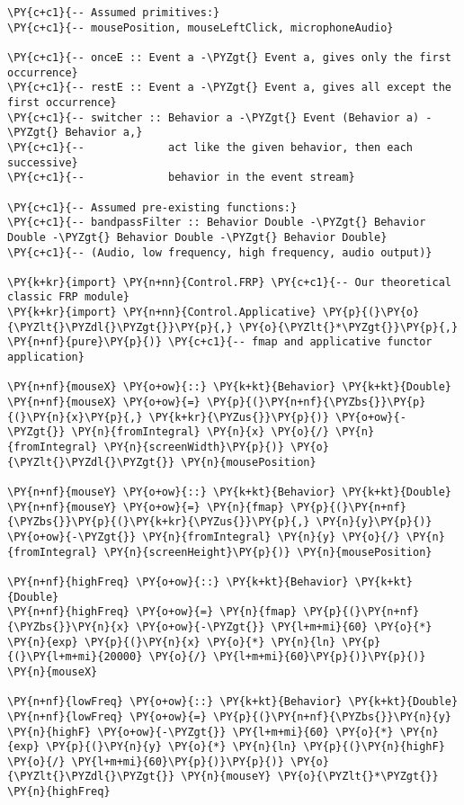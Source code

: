 \begin{Verbatim}[commandchars=\\\{\}]
\PY{c+c1}{-- Assumed primitives:}
\PY{c+c1}{-- mousePosition, mouseLeftClick, microphoneAudio}

\PY{c+c1}{-- onceE :: Event a -\PYZgt{} Event a, gives only the first occurrence}
\PY{c+c1}{-- restE :: Event a -\PYZgt{} Event a, gives all except the first occurrence}
\PY{c+c1}{-- switcher :: Behavior a -\PYZgt{} Event (Behavior a) -\PYZgt{} Behavior a,}
\PY{c+c1}{--             act like the given behavior, then each successive}
\PY{c+c1}{--             behavior in the event stream}

\PY{c+c1}{-- Assumed pre-existing functions:}
\PY{c+c1}{-- bandpassFilter :: Behavior Double -\PYZgt{} Behavior Double -\PYZgt{} Behavior Double -\PYZgt{} Behavior Double}
\PY{c+c1}{-- (Audio, low frequency, high frequency, audio output)}

\PY{k+kr}{import} \PY{n+nn}{Control.FRP} \PY{c+c1}{-- Our theoretical classic FRP module}
\PY{k+kr}{import} \PY{n+nn}{Control.Applicative} \PY{p}{(}\PY{o}{\PYZlt{}\PYZdl{}\PYZgt{}}\PY{p}{,} \PY{o}{\PYZlt{}*\PYZgt{}}\PY{p}{,} \PY{n+nf}{pure}\PY{p}{)} \PY{c+c1}{-- fmap and applicative functor application}

\PY{n+nf}{mouseX} \PY{o+ow}{::} \PY{k+kt}{Behavior} \PY{k+kt}{Double}
\PY{n+nf}{mouseX} \PY{o+ow}{=} \PY{p}{(}\PY{n+nf}{\PYZbs{}}\PY{p}{(}\PY{n}{x}\PY{p}{,} \PY{k+kr}{\PYZus{}}\PY{p}{)} \PY{o+ow}{-\PYZgt{}} \PY{n}{fromIntegral} \PY{n}{x} \PY{o}{/} \PY{n}{fromIntegral} \PY{n}{screenWidth}\PY{p}{)} \PY{o}{\PYZlt{}\PYZdl{}\PYZgt{}} \PY{n}{mousePosition}

\PY{n+nf}{mouseY} \PY{o+ow}{::} \PY{k+kt}{Behavior} \PY{k+kt}{Double}
\PY{n+nf}{mouseY} \PY{o+ow}{=} \PY{n}{fmap} \PY{p}{(}\PY{n+nf}{\PYZbs{}}\PY{p}{(}\PY{k+kr}{\PYZus{}}\PY{p}{,} \PY{n}{y}\PY{p}{)} \PY{o+ow}{-\PYZgt{}} \PY{n}{fromIntegral} \PY{n}{y} \PY{o}{/} \PY{n}{fromIntegral} \PY{n}{screenHeight}\PY{p}{)} \PY{n}{mousePosition}

\PY{n+nf}{highFreq} \PY{o+ow}{::} \PY{k+kt}{Behavior} \PY{k+kt}{Double}
\PY{n+nf}{highFreq} \PY{o+ow}{=} \PY{n}{fmap} \PY{p}{(}\PY{n+nf}{\PYZbs{}}\PY{n}{x} \PY{o+ow}{-\PYZgt{}} \PY{l+m+mi}{60} \PY{o}{*} \PY{n}{exp} \PY{p}{(}\PY{n}{x} \PY{o}{*} \PY{n}{ln} \PY{p}{(}\PY{l+m+mi}{20000} \PY{o}{/} \PY{l+m+mi}{60}\PY{p}{)}\PY{p}{)} \PY{n}{mouseX}

\PY{n+nf}{lowFreq} \PY{o+ow}{::} \PY{k+kt}{Behavior} \PY{k+kt}{Double}
\PY{n+nf}{lowFreq} \PY{o+ow}{=} \PY{p}{(}\PY{n+nf}{\PYZbs{}}\PY{n}{y} \PY{n}{highF} \PY{o+ow}{-\PYZgt{}} \PY{l+m+mi}{60} \PY{o}{*} \PY{n}{exp} \PY{p}{(}\PY{n}{y} \PY{o}{*} \PY{n}{ln} \PY{p}{(}\PY{n}{highF} \PY{o}{/} \PY{l+m+mi}{60}\PY{p}{)}\PY{p}{)} \PY{o}{\PYZlt{}\PYZdl{}\PYZgt{}} \PY{n}{mouseY} \PY{o}{\PYZlt{}*\PYZgt{}} \PY{n}{highFreq}


\end{Verbatim}
